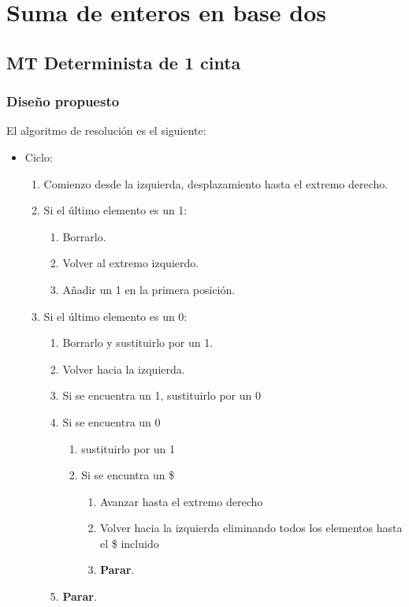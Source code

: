 \section{Suma de enteros en base dos}


\subsection{MT Determinista de 1 cinta}

\subsubsection*{Diseño propuesto}
El algoritmo de resolución es el siguiente:

\begin{itemize}
    \item Ciclo:
    \begin{enumerate}
        \item Comienzo desde la izquierda, desplazamiento hasta el extremo derecho.
        \item Si el último elemento es un 1:
        \begin{enumerate}[1.]
            \item Borrarlo.
            \item Volver al extremo izquierdo.
            \item Añadir un 1 en la primera posición.
        \end{enumerate}
        \item Si el último elemento es un 0:
        \begin{enumerate}[1.]
            \item Borrarlo y sustituirlo por un 1.
            \item Volver hacia la izquierda.
            \item Si se encuentra un 1, sustituirlo por un 0
            \item Si se encuentra un 0
            \begin{enumerate}[1.]
                \item sustituirlo por un 1
                \item Si se encuntra un \$
                \begin{enumerate}[1.]
                    \item Avanzar hasta el extremo derecho
                    \item Volver hacia la izquierda eliminando todos los elementos hasta el \$ incluido
                    \item \textbf{Parar}.
                \end{enumerate}
            \end{enumerate}
            \item \textbf{Parar}.
        \end{enumerate}
    \end{enumerate}
\end{itemize}

